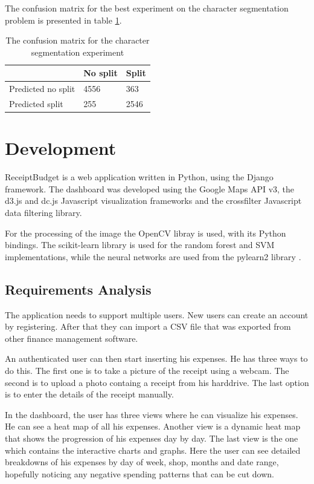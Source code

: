 The confusion matrix for the best experiment on the character segmentation problem is presented in table \ref{table:seg_conf}.

\begin{table}[h]
\caption{The confusion matrix for the character segmentation experiment}
\label{table:seg_conf}
\begin{tabular}{lll}
\hline
 & No split & Split \\ \hline
Predicted no split & 4556 & 363 \\ 
Predicted split & 255 & 2546 \\  \hline
\end{tabular}
\end{table}
\section{Development}

ReceiptBudget is a web application written in Python, using the Django framework. The dashboard was developed using the Google Maps API v3, the d3.js and dc.js Javascript visualization frameworks and the crossfilter Javascript data filtering library. 

For the processing of the image the OpenCV libray is used, with its Python bindings. The scikit-learn library \cite{pedregosa2011scikit} is used for the random forest and SVM implementations, while the neural networks are used from the pylearn2 library \cite{goodfellow2013pylearn2}. 
\subsection{Requirements Analysis}
The application needs to support multiple users. New users can create an account by registering. After that they can import a CSV file that was exported from other finance management software. 

An authenticated user can then start inserting his expenses. He has three ways to do this. The first one is to take a picture of the receipt using a webcam. The second is to upload a photo containg a receipt from his harddrive. The last option is to enter the details of the receipt manually. 

In the dashboard, the user has three views where he can visualize his expenses. He can see a heat map of all his expenses. Another view is a dynamic heat map that shows the progression of his expenses day by day. The last view is the one which contains the interactive charts and graphs. Here the user can see detailed breakdowns of his expenses by day of week, shop, months and date range, hopefully noticing any negative spending patterns that can be cut down. 

